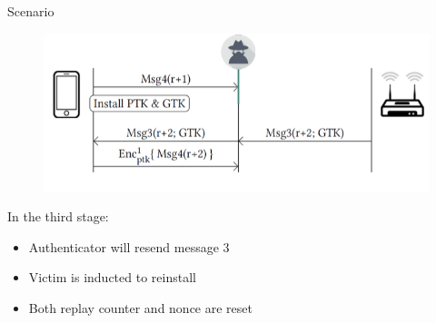 \documentclass[11pt,t]{beamer}
\begin{document}
\begin{frame}[fragile]{Scenario}  

	\begin{figure}[tbh]
		\centering
		\includegraphics[width=0.9\linewidth]{graphics/krack/k3.png}
		\label{fig:k3}
	  \end{figure}

	In the third stage:
	\begin{itemize}
	\item Authenticator will resend message 3 
	\item Victim is inducted to reinstall 
	\item Both replay counter and nonce are reset
	\end{itemize}

\sed
\end{frame}
\end{document}

